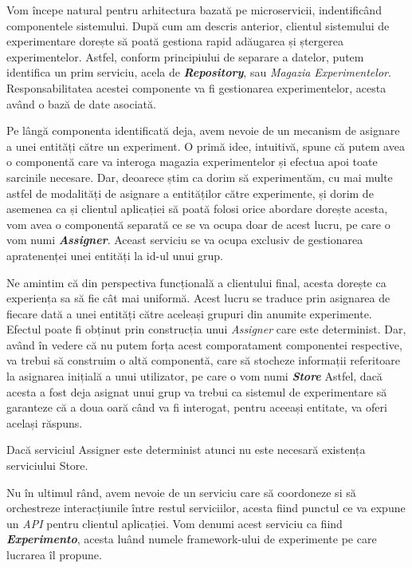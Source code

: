 Vom începe natural pentru arhitectura bazată pe microservicii, indentificând componentele sistemului. După cum am descris anterior, clientul sistemului de experimentare dorește să poată gestiona rapid adăugarea și ștergerea experimentelor. Astfel, conform principiului de separare a datelor, putem identifica un prim serviciu, acela de \textbf{\textit{Repository}}, sau \textit{Magazia Experimentelor}. Responsabilitatea acestei componente va fi gestionarea experimentelor, acesta având o bază de date asociată. 

Pe lângă componenta identificată deja, avem nevoie de un mecanism de asignare a unei entități către un experiment. O primă idee, intuitivă, spune că putem avea o componentă care va interoga magazia experimentelor și efectua apoi toate sarcinile necesare. Dar, deoarece știm ca dorim să experimentăm, cu mai multe astfel de modalități de asignare a entităților către experimente, și dorim de asemenea ca și clientul aplicației să poată folosi orice abordare dorește acesta, vom avea o componentă separată ce se va ocupa doar de acest lucru, pe care o vom numi \textit{\textbf{Assigner}}. Aceast serviciu se va ocupa exclusiv de gestionarea apratenenței unei entități la id-ul unui grup.

Ne amintim că din perspectiva funcțională a clientului final, acesta dorește ca experiența sa să fie cât mai uniformă. Acest lucru se traduce prin asignarea de fiecare dată a unei entități către aceleași grupuri din anumite experimente. Efectul poate fi obținut prin construcția unui \textit{Assigner} care este determinist. Dar, având în vedere că nu putem forța acest comporatament componentei respective, va trebui să construim o altă componentă, care să stocheze informații referitoare la asignarea inițială a unui utilizator, pe care o vom numi \textit{\textbf{Store}} Astfel, dacă acesta a fost deja asignat unui grup va trebui ca sistemul de experimentare să garanteze că a doua oară când va fi interogat, pentru aceeași entitate, va oferi același răspuns.

\begin{remark}
	Dacă serviciul Assigner este determinist atunci nu este necesară existența serviciului Store. 
\end{remark}

Nu în ultimul rând, avem nevoie de un serviciu care să coordoneze si să orchestreze interacțiunile între restul serviciilor, acesta fiind punctul ce va expune un \textit{API} pentru clientul aplicației. Vom denumi acest serviciu ca fiind \textit{\textbf{Experimento}}, acesta luând numele framework-ului de experimente pe care lucrarea îl propune. 

